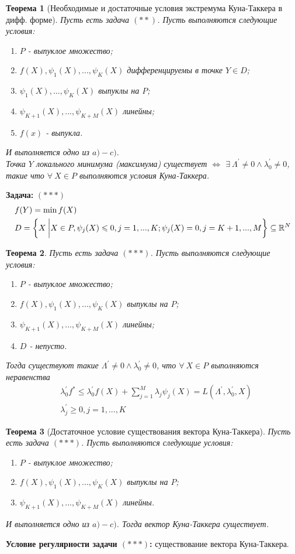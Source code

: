 \documentclass[12pt]{article}
\newtheorem{theorem}{Теорема}[section]
\theoremstyle{definition}
\theoremstyle{remark}
\begin{document}
\begin{theorem}[Необходимые и достаточные условия экстремума Куна-Таккера в дифф. форме]
  Пусть есть задача $(**)$. Пусть выполняются следующие условия:
  \begin{enumerate}
    \item $P$ - выпуклое множество;
    \item $f(X),\psi_1(X),...,\psi_K(X)$ дифференцируемы в точке $Y\in D$;
    \item $\psi_1(X),...,\psi_K(X)$ выпуклы на $P$;
    \item $\psi_{K+1}(X),...,\psi_{K+M}(X)$ линейны;
    \item $f(x)$ - выпукла.
  \end{enumerate}
  И выполняется одно из $a)-c)$.\\
  Точка $Y$ локального минимума (максимума) существует $\iff$ $\exists\: \Lambda^{'}\neq 0 \land \lambda_0^{'}\neq 0$, такие что $\forall\:X\in P $ выполняются условия Куна-Таккера.
\end{theorem}

\textbf{Задача: }$(***)$
\begin{align}
  &f(Y)=\min{f(X)}\notag\\
  &D=\bigg\{ X\:\bigg|X\in P, \psi_j(X)\leqslant 0,j=1,...,K;\psi_j(X)= 0,j=K+1,...,M\bigg\}\subseteq \mathbb{R}^N\notag
\end{align}

\begin{theorem}
  Пусть есть задача $(***)$. Пусть выполняются следующие условия:
  \begin{enumerate}
    \item $P$ - выпуклое множество;
    \item $f(X),\psi_1(X),...,\psi_K(X)$ выпуклы на $P$;
    \item $\psi_{K+1}(X),...,\psi_{K+M}(X)$ линейны;
    \item $D$ - непусто.
  \end{enumerate}
  Тогда существуют такие $\Lambda^{'}\neq 0 \land \lambda_0^{'}\neq 0$, что $\forall\:X\in P $ выполняются неравенства
  \begin{align}
    &\lambda_0^{'}f^{*}\leqslant \lambda_0^{'}f(X)+\sum_{j=1}^M \lambda_j \psi_j(X)=L(\Lambda^{'},\lambda_0^{'},X)\\
    &\lambda_j^{'}\geqslant 0, j=1,...,K
  \end{align}
\end{theorem}

\begin{theorem}[Достаточное условие существования вектора Куна-Таккера]
  Пусть есть задача $(***)$. Пусть выполняются следующие условия:
  \begin{enumerate}
    \item $P$ - выпуклое множество;
    \item $f(X),\psi_1(X),...,\psi_K(X)$ выпуклы на $P$;
    \item $\psi_{K+1}(X),...,\psi_{K+M}(X)$ линейны.
  \end{enumerate}
  И выполняется одно из $a)-c)$. Тогда вектор Куна-Таккера существует.
\end{theorem}
\textbf{Условие регулярности задачи $(***)$: }существование вектора Куна-Таккера.
\end{document}

